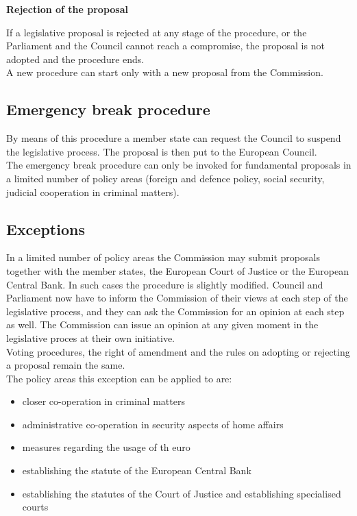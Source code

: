 \textbf{Rejection of the proposal}

If a legislative proposal is rejected at any stage of the procedure, or the Parliament and the Council cannot reach a compromise, the proposal is not adopted and the procedure ends. \\

A new procedure can start only with a new proposal from the Commission.

\subsection{Emergency break procedure}
By means of this procedure a member state can request the Council to suspend the legislative process. The proposal is then put to the European Council. \\
The emergency break procedure can only be invoked for fundamental proposals in a limited number of policy areas (foreign and defence policy, social security, judicial cooperation in criminal matters).

\subsection{Exceptions}
In a limited number of policy areas the Commission may submit proposals together with the member states, the European Court of Justice or the European Central Bank. In such cases the procedure is slightly modified. Council and Parliament now have to inform the Commission of their views at each step of the legislative process, and they can ask the Commission for an opinion at each step as well. The Commission can issue an opinion at any given moment in the legislative proces at their own initiative. \\

Voting procedures, the right of amendment and the rules on adopting or rejecting a proposal remain the same. \\

The policy areas this exception can be applied to are:
\begin{itemize}
	\item closer co-operation in criminal matters
	\item administrative co-operation in security aspects of home affairs
	\item measures regarding the usage of th euro
	\item establishing the statute of the European Central Bank
	\item establishing the statutes of the Court of Justice and establishing specialised courts
\end{itemize}
\clearpage





























